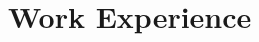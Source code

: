 \documentclass[11pt,a4paper]{moderncv}
\begin{document}
%
%
%	
%	
%	
%	



\section{Work Experience}
\end{document}
